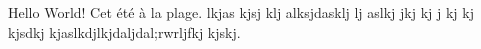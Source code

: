 \documentclass{book}
\begin{document}
Hello World! Cet été à la plage. lkjas kjsj klj alksjdasklj lj aslkj
jkj kj  j kj kj kjsdkj kjaslkdjlkjdaljdal;rwrljfkj  kjskj.
\end{document}
